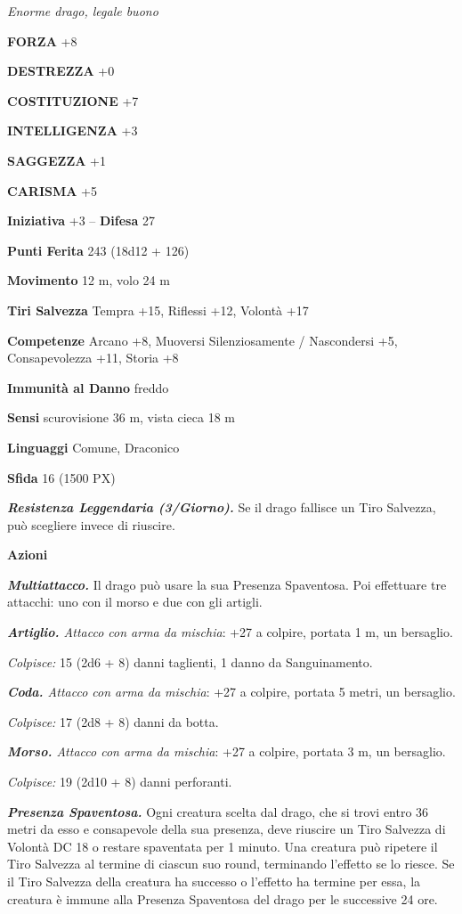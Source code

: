 \begin{multicols}{2}
	\textit{Enorme drago, legale buono}

	\textbf{FORZA} +8

	\textbf{DESTREZZA} +0

	\textbf{COSTITUZIONE} +7

	\textbf{INTELLIGENZA} +3

	\textbf{SAGGEZZA} +1

	\textbf{CARISMA} +5

	\textbf{Iniziativa} +3 -- \textbf{Difesa} 27

	\textbf{Punti Ferita} 243 (18d12 + 126)

	\textbf{Movimento} 12 m, volo 24 m

	\textbf{Tiri Salvezza} Tempra +15, Riflessi +12, Volontà +17

	\textbf{Competenze} Arcano +8, Muoversi Silenziosamente / Nascondersi +5, Consapevolezza +11, Storia +8

	\textbf{Immunità al Danno} freddo

	\textbf{Sensi} scurovisione 36 m, vista cieca 18 m

	\textbf{Linguaggi} Comune, Draconico

	\textbf{Sfida} 16 (1500 PX)

	\textit{\textbf{Resistenza Leggendaria (3/Giorno).}} Se il drago fallisce un Tiro Salvezza, può scegliere invece di riuscire.

	\textbf{Azioni}

	\textit{\textbf{Multiattacco.}} Il drago può usare la sua Presenza Spaventosa. Poi effettuare tre attacchi: uno con il morso e due con gli artigli.

	\textit{\textbf{Artiglio.} Attacco con arma da mischia}: +27 a colpire, portata 1 m, un bersaglio.

	\textit{Colpisce:} 15 (2d6 + 8) danni taglienti, 1 danno da Sanguinamento.

	\textit{\textbf{Coda.} Attacco con arma da mischia}: +27 a colpire, portata 5 metri, un bersaglio.

	\textit{Colpisce:} 17 (2d8 + 8) danni da botta.

	\textit{\textbf{Morso.} Attacco con arma da mischia}: +27 a colpire, portata 3 m, un bersaglio.

	\textit{Colpisce:} 19 (2d10 + 8) danni perforanti.

	\textit{\textbf{Presenza Spaventosa.}} Ogni creatura scelta dal drago, che si trovi entro 36 metri da esso e consapevole della sua presenza, deve riuscire un Tiro Salvezza di Volontà DC 18 o restare spaventata per 1 minuto. Una creatura può ripetere il Tiro Salvezza al termine di ciascun suo round, terminando l'effetto se lo riesce. Se il Tiro Salvezza della creatura ha successo o l'effetto ha termine per essa, la creatura è immune alla Presenza Spaventosa del drago per le successive 24 ore.


\end{multicols}
